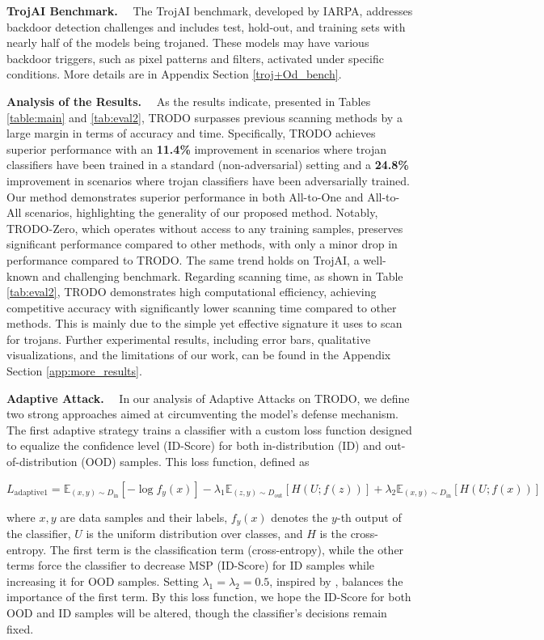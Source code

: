 \textbf{TrojAI Benchmark.} \ \ The TrojAI \cite{trojai} benchmark, developed by IARPA, addresses backdoor detection challenges and includes test, hold-out, and training sets with nearly half of the models being trojaned. These models may have various backdoor triggers, such as pixel patterns and filters, activated under specific conditions. More details are in Appendix Section \ref{troj+Od_bench}.

\textbf{Analysis of the Results.} \ \ As the results indicate, presented in Tables \ref{table:main} and \ref{tab:eval2}, TRODO surpasses previous scanning methods by a large margin in terms of accuracy and time. Specifically, TRODO achieves superior performance with an \textbf{11.4\%} improvement in scenarios where trojan classifiers have been trained in a standard (non-adversarial) setting and a \textbf{24.8\%} improvement in scenarios where trojan classifiers have been adversarially trained. Our method demonstrates superior performance in both All-to-One and All-to-All scenarios, highlighting the generality of our proposed method. Notably, TRODO-Zero, which operates without access to any training samples, preserves significant performance compared to other methods, with only a minor drop in performance compared to TRODO. The same trend holds on TrojAI, a well-known and challenging benchmark. Regarding scanning time, as shown in Table \ref{tab:eval2}, TRODO demonstrates high computational efficiency, achieving competitive accuracy with significantly lower scanning time compared to other methods. This is mainly due to the simple yet effective signature it uses to scan for trojans. Further experimental results, including error bars, qualitative visualizations, and the limitations of our work, can be found in the Appendix Section \ref{app:more_results}.


\textbf{Adaptive Attack.} \ \ 
In our analysis of Adaptive Attacks on TRODO, we define two strong approaches aimed at circumventing the model’s defense mechanism. The first adaptive strategy trains a classifier with a custom loss function designed to equalize the confidence level (ID-Score) for both in-distribution (ID) and out-of-distribution (OOD) samples. This loss function, defined as
{ \small
\[
L_{\text{adaptive1}} = \mathbb{E}_{(x,y) \sim D_{\text{in}}} \left[ -\log f_y(x) \right] - \lambda_1 \mathbb{E}_{(z,y) \sim D_{\text{out}}} \left[ H(U; f(z)) \right] + \lambda_2 \mathbb{E}_{(x,y) \sim D_{\text{in}}} \left[ H(U; f(x)) \right]
\]

}

where \( x, y \) are data samples and their labels, \( f_y(x) \) denotes the \( y \)-th output of the classifier, \( U \) is the uniform distribution over classes, and \( H \) is the cross-entropy. The first term is the classification term (cross-entropy), while the other terms force the classifier to decrease MSP (ID-Score) for ID samples while increasing it for OOD samples. Setting $\lambda_1 = \lambda_2 = 0.5$, inspired by \cite{hendrycks2019oe}, balances the importance of the first term. By this loss function, we hope the ID-Score for both OOD and ID samples will be altered, though the classifier's decisions remain fixed.

